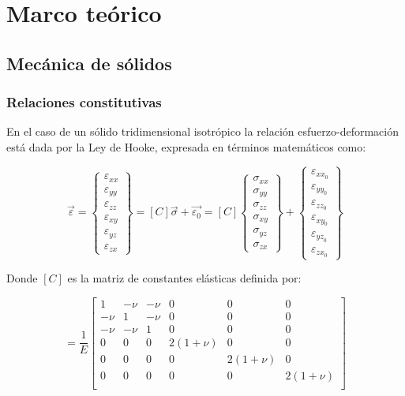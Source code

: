 \chapter{Marco teórico}

\section{Mecánica de sólidos}

\subsection{Relaciones constitutivas}

En el caso de un sólido tridimensional isotrópico la relación esfuerzo-deformación está dada por la Ley de Hooke, 
expresada en términos matemáticos como:

\begin{equation}\label{eq:ecdef}
\vec{\varepsilon} = 
\left\{\begin{matrix}
\varepsilon_{xx} \\ \varepsilon_{yy} \\ \varepsilon_{zz} \\ \varepsilon_{xy} \\ \varepsilon_{yz} \\ \varepsilon_{zx}
\end{matrix}\right\} = 
\left[ C \right] \vec{\sigma} + \vec{\varepsilon_0} = 
\left[ C \right]
\left\{\begin{matrix}
\sigma_{xx} \\ \sigma_{yy} \\ \sigma_{zz} \\ \sigma_{xy} \\ \sigma_{yz} \\ \sigma_{zx}
\end{matrix}\right\} + 
\left\{\begin{matrix}
\varepsilon_{xx}_0 \\ \varepsilon_{yy}_0 \\ \varepsilon_{zz}_0 \\ \varepsilon_{xy}_0 \\ \varepsilon_{yz}_0 \\ \varepsilon_{zx}_0
\end{matrix}\right\}
\end{equation}

Donde $[C]$ es la matriz de constantes elásticas definida por:

\begin{equation}
[C] = \frac{1}{E}
\left[\begin{matrix}
1 & -\nu & -\nu & 0 & 0 & 0 \\
-\nu & 1 & -\nu & 0 & 0 & 0 \\
-\nu & -\nu & 1 & 0 & 0 & 0 \\
0 & 0 & 0 & 2(1+\nu) & 0 & 0 \\
0 & 0 & 0 & 0 & 2(1+\nu) & 0 \\
0 & 0 & 0 & 0 & 0 & 2(1+\nu) \\
\end{matrix}\right]
\end{equation}

